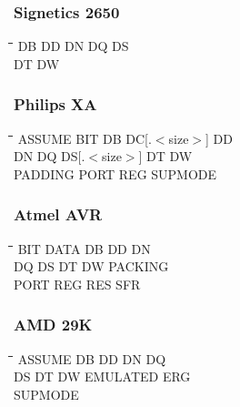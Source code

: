 \subsubsection{Signetics 2650}
{\tt\begin{tabbing}
\hspace{3cm}\=\hspace{3cm}\=\hspace{3cm}\=\hspace{3cm}\=\kill
DB         \> DD          \> DN          \> DQ          \> DS \\
DT         \> DW          \\
\end{tabbing}}

\subsubsection{Philips XA}
{\tt\begin{tabbing}
\hspace{3cm}\=\hspace{3cm}\=\hspace{3cm}\=\hspace{3cm}\=\kill
ASSUME     \> BIT         \> DB          \> DC[.$<$size$>$] \> DD \\
DN         \> DQ          \> DS[.$<$size$>$] \> DT      \> DW \\
PADDING    \> PORT        \> REG         \> SUPMODE \\
\end{tabbing}}

\subsubsection{Atmel AVR}
{\tt\begin{tabbing}
\hspace{3cm}\=\hspace{3cm}\=\hspace{3cm}\=\hspace{3cm}\=\kill
BIT        \> DATA       \> DB          \> DD           \> DN \\
DQ         \> DS         \> DT          \> DW           \> PACKING \\
PORT       \> REG        \> RES         \> SFR \\
\end{tabbing}}

\subsubsection{AMD 29K}
{\tt\begin{tabbing}
\hspace{3cm}\=\hspace{3cm}\=\hspace{3cm}\=\hspace{3cm}\=\kill
ASSUME     \> DB          \> DD          \> DN          \> DQ \\
DS         \> DT          \> DW          \> EMULATED    \> ERG \\
SUPMODE \\
\end{tabbing}}

